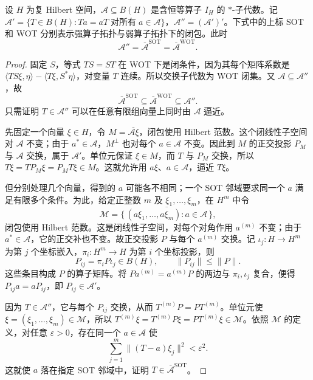 \begin{theorem}\label{b2:thm:operator-bicommutant}
	设 \(H\) 为复 Hilbert 空间，\(\mathcal A\subseteq B(H)\) 是含恒等算子 \(I_H\) 的 \(*\)-子代数。记 \(\mathcal A'=\{T\in B(H):Ta=aT\;\text{对所有}\;a\in\mathcal A\}\)，\(\mathcal A''=(\mathcal A')'\)。下式中的上标 SOT 和 WOT 分别表示强算子拓扑与弱算子拓扑下的闭包。此时
	\[
		\mathcal A''=\overline{\mathcal A}^{\mathrm{SOT}} =\overline{\mathcal A}^{\mathrm{WOT}}.
	\]
\end{theorem}
\begin{proof}
	固定 \(S\)，等式 \(TS=ST\) 在 WOT 下是闭条件，因为其每个矩阵系数是 \(\langle TS\xi,\eta\rangle-\langle T\xi,S^*\eta\rangle\)，对变量 \(T\) 连续。所以交换子代数为 WOT 闭集。又 \(\mathcal A\subseteq\mathcal A''\)，故
	\[
		\overline{\mathcal A}^{\mathrm{SOT}}\subseteq \overline{\mathcal A}^{\mathrm{WOT}}\subseteq\mathcal A''.
	\]
	只需证明 \(T\in\mathcal A''\) 可以在任意有限组向量上同时由 \(\mathcal A\) 逼近。

	先固定一个向量 \(\xi\in H\)，令 \(M=\overline{\mathcal A\xi}\)，闭包使用 Hilbert 范数。这个闭线性子空间对 \(\mathcal A\) 不变；由于 \(a^*\in\mathcal A\)，\(M^\perp\) 也对每个 \(a\in\mathcal A\) 不变。因此到 \(M\) 的正交投影 \(P_M\) 与 \(\mathcal A\) 交换，属于 \(\mathcal A'\)。单位元保证 \(\xi\in M\)，而 \(T\) 与 \(P_M\) 交换，所以 \(T\xi=TP_M\xi=P_MT\xi\in M\)。这就允许用 \(a\xi\)、\(a\in\mathcal A\)，逼近 \(T\xi\)。

	但分别处理几个向量，得到的 \(a\) 可能各不相同；一个 SOT 邻域要求同一个 \(a\) 满足有限多个条件。为此，给定正整数 \(m\) 及 \(\xi_1,\ldots,\xi_m\)，在 \(H^m\) 中令
	\[
		\mathcal M=\overline{\bigl\{\,(a\xi_1,\ldots,a\xi_m):a\in\mathcal A\,\bigr\}},
	\]
	闭包使用 Hilbert 范数。这是闭线性子空间，对每个对角作用 \(a^{(m)}\) 不变；由于 \(a^*\in\mathcal A\)，它的正交补也不变。故正交投影 \(P\) 与每个 \(a^{(m)}\) 交换。记 \(\iota_j:H\to H^m\) 为第 \(j\) 个坐标嵌入，\(\pi_i:H^m\to H\) 为第 \(i\) 个坐标投影，则
	\[
		P_{ij}=\pi_iP\iota_j\in B(H),\qquad \|P_{ij}\|\le\|P\|.
	\]
	这些条目构成 \(P\) 的算子矩阵。将 \(Pa^{(m)}=a^{(m)}P\) 的两边与 \(\pi_i,\iota_j\) 复合，便得 \(P_{ij}a=aP_{ij}\)，即 \(P_{ij}\in\mathcal A'\)。

	因为 \(T\in\mathcal A''\)，它与每个 \(P_{ij}\) 交换，从而 \(T^{(m)}P=PT^{(m)}\)。单位元使 \(\xi=(\xi_1,\ldots,\xi_m)\in\mathcal M\)，所以 \(T^{(m)}\xi=T^{(m)}P\xi=PT^{(m)}\xi\in\mathcal M\)。依照 \(\mathcal M\) 的定义，对任意 \(\varepsilon>0\)，存在同一个 \(a\in\mathcal A\) 使
	\[
		\sum_{j=1}^m\bigl\lVert(T-a)\xi_j\bigr\rVert^2<\varepsilon^2.
	\]
	这就使 \(a\) 落在指定 SOT 邻域中，证明 \(T\in\overline{\mathcal A}^{\mathrm{SOT}}\)。
\end{proof}

